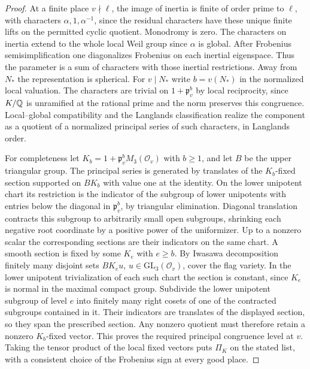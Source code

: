 \documentclass[a4paper,11pt]{article}
\theoremstyle{definition}
\theoremstyle{remark}
\numberwithin{equation}{section}
\begin{document}
\begin{proof}
At a finite place \(v\nmid\ell\), the image of inertia is finite of order
prime to \(\ell\), with characters \(\alpha,1,\alpha^{-1}\), since
the residual characters have these unique finite lifts on the
permitted cyclic quotient. Monodromy is zero. The characters
on inertia extend to the whole local Weil group since \(\alpha\)
is global. After Frobenius semisimplification one diagonalizes
Frobenius on each inertial eigenspace. Thus the parameter is
a sum of characters with those inertial restrictions. Away from
\(N_*\) the representation is spherical. For \(v\mid N_*\) write
\(b=v(N_*)\) in the normalized local valuation. The characters
are trivial on \(1+\mathfrak p_v^b\) by local reciprocity, since
\(K/\mathbb Q\) is unramified at the rational prime and the norm
preserves this congruence. Local--global compatibility and the
Langlands classification realize the component as a quotient
of a normalized principal series of such characters, in
Langlands order.~\cite{VII-V-V-shin}

For completeness let \(K_b=1+\mathfrak p_v^bM_3(\mathcal O_v)\)
with \(b\ge1\), and let \(B\) be the upper triangular group.
The principal series is generated by translates of the
\(K_b\)-fixed section supported on \(BK_b\) with value one at
the identity. On the lower unipotent chart its restriction is
the indicator of the subgroup of lower unipotents with entries
below the diagonal in \(\mathfrak p_v^b\), by triangular
elimination. Diagonal translation contracts this subgroup to
arbitrarily small open subgroups, shrinking each negative root
coordinate by a positive power of the uniformizer. Up to a
nonzero scalar the corresponding sections are their indicators
on the same chart. A smooth section is fixed by some \(K_e\)
with \(e\ge b\). By Iwasawa decomposition finitely many disjoint
sets \(BK_e u\), \(u\in\mathrm{GL}_3(\mathcal O_v)\), cover the
flag variety. In the lower unipotent trivialization of each
such chart the section is constant, since \(K_e\) is normal in
the maximal compact group. Subdivide the lower unipotent
subgroup of level \(e\) into finitely many right cosets of
one of the contracted subgroups contained in it. Their
indicators are translates of the displayed section, so they
span the prescribed section. Any nonzero quotient must
therefore retain a nonzero \(K_b\)-fixed vector. This proves
the required principal congruence level at \(v\).
Taking the tensor product of the local fixed vectors puts
\(\Pi_K\) on the stated list, with a consistent choice of the
Frobenius sign at every good place.
\end{proof}
\end{document}
